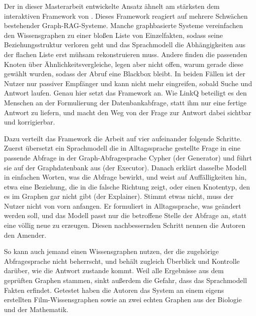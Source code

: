 Der in dieser Masterarbeit entwickelte Ansatz ähnelt am stärksten dem interaktiven Framework von \textcite{pusch2026hitlkgqa}. Dieses Framework reagiert auf mehrere Schwächen bestehender Graph-RAG-Systeme. Manche graphbasierte Systeme vereinfachen den Wissensgraphen zu einer bloßen Liste von Einzelfakten, sodass seine Beziehungsstruktur verloren geht und das Sprachmodell die Abhängigkeiten aus der flachen Liste erst mühsam rekonstruieren muss. Andere finden die passenden Knoten über Ähnlichkeitsvergleiche, legen aber nicht offen, warum gerade diese gewählt wurden, sodass der Abruf eine Blackbox bleibt. In beiden Fällen ist der Nutzer nur passiver Empfänger und kann nicht mehr eingreifen, sobald Suche und Antwort laufen. Genau hier setzt das Framework an. Wie LinkQ beteiligt es den Menschen an der Formulierung der Datenbankabfrage, statt ihm nur eine fertige Antwort zu liefern, und macht den Weg von der Frage zur Antwort dabei sichtbar und korrigierbar.

Dazu verteilt das Framework die Arbeit auf vier aufeinander folgende Schritte. Zuerst übersetzt ein Sprachmodell die in Alltagssprache gestellte Frage in eine passende Abfrage in der Graph-Abfragesprache Cypher (der Generator) und führt sie auf der Graphdatenbank aus (der Executor). Danach erklärt dasselbe Modell in einfachen Worten, was die Abfrage bewirkt, und weist auf Auffälligkeiten hin, etwa eine Beziehung, die in die falsche Richtung zeigt, oder einen Knotentyp, den es im Graphen gar nicht gibt (der Explainer). Stimmt etwas nicht, muss der Nutzer nicht von vorn anfangen. Er formuliert in Alltagssprache, was geändert werden soll, und das Modell passt nur die betroffene Stelle der Abfrage an, statt eine völlig neue zu erzeugen. Diesen nachbessernden Schritt nennen die Autoren den Amender.

So kann auch jemand einen Wissensgraphen nutzen, der die zugehörige Abfragesprache nicht beherrscht, und behält zugleich Überblick und Kontrolle darüber, wie die Antwort zustande kommt. Weil alle Ergebnisse aus dem geprüften Graphen stammen, sinkt außerdem die Gefahr, dass das Sprachmodell Fakten erfindet. Getestet haben die Autoren das System an einem eigens erstellten Film-Wissensgraphen sowie an zwei echten Graphen aus der Biologie und der Mathematik.

